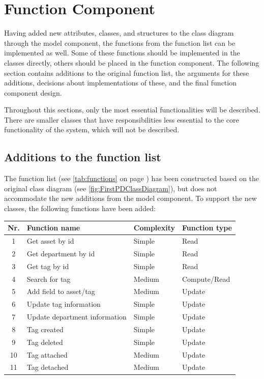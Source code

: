\section{Function Component} \label{sc:function_component}
Having added new attributes, classes, and structures to the class diagram through the model component, the functions from the function list can be implemented as well. Some of these functions should be implemented in the classes directly, others should be placed in the function component. The following section contains additions to the original function list, the arguments for these additions, decisions about implementations of these, and the final function component design.
\par
Throughout this sections, only the most essential functionalities will be described. There are smaller classes that have responsibilities less essential to the core functionality of the system, which will not be described.

\subsection{Additions to the function list}
The function list (see \autoref{tab:functions} on page \pageref{tab:functions}) has been constructed based on the original class diagram (see \autoref{fig:FirstPDClassDiagram}), but does not accommodate the new additions from the model component. To support the new classes, the following functions have been added:

\begin{table}[H]
\centering
    \begin{tabular}{|c|l|l|l|}
        \hline
        \textbf{Nr.} & \textbf{Function name} & \textbf{Complexity} & \textbf{Function type}\\
        \hline
        1 & Get asset by id & Simple & Read\\
        \hline
        2 & Get department by id & Simple & Read\\
        \hline
        3 & Get tag by id & Simple & Read\\
        \hline
        4 & Search for tag & Medium & Compute/Read\\
        \hline
        5 & Add field to asset/tag & Medium & Update\\
        \hline
        6 & Update tag information & Simple & Update\\
        \hline
        7 & Update department information & Simple & Update\\
        \hline
        8 & Tag created & Simple & Update\\
        \hline
        9 & Tag deleted & Simple & Update\\
        \hline
        10 & Tag attached & Medium & Update\\
        \hline
        11 & Tag detached & Medium & Update\\
        \hline
    \end{tabular}
\end{table}

